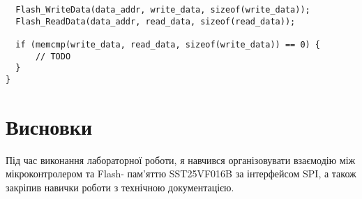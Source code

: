 \documentclass[oneside,14pt]{extarticle}
\begin{document}
\begin{normalsize}
{\begin{lstlisting}
  Flash_WriteData(data_addr, write_data, sizeof(write_data));
  Flash_ReadData(data_addr, read_data, sizeof(read_data));

  if (memcmp(write_data, read_data, sizeof(write_data)) == 0) {
	  // TODO
  }
}\end{lstlisting}}
	
	\section*{Висновки}
	Під час виконання лабораторної роботи, я навчився організовувати взаємодію між мікроконтролером та Flash-
пам’яттю SST25VF016B за інтерфейсом SPI, а також закріпив навички роботи з
технічною документацією.
	    
\end{normalsize}
\end{document}

